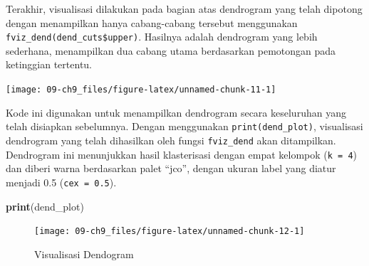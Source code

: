 \documentclass[
  oneside]{book}
\newenvironment{Shaded}{\begin{snugshade}}{\end{snugshade}}
\newcommand{\AttributeTok}[1]{\textcolor[rgb]{0.13,0.29,0.53}{#1}}
\newcommand{\DecValTok}[1]{\textcolor[rgb]{0.00,0.00,0.81}{#1}}
\newcommand{\FloatTok}[1]{\textcolor[rgb]{0.00,0.00,0.81}{#1}}
\newcommand{\FunctionTok}[1]{\textcolor[rgb]{0.13,0.29,0.53}{\textbf{#1}}}
\newcommand{\NormalTok}[1]{#1}
\newcommand{\OtherTok}[1]{\textcolor[rgb]{0.56,0.35,0.01}{#1}}
\newcommand{\SpecialCharTok}[1]{\textcolor[rgb]{0.81,0.36,0.00}{\textbf{#1}}}
\newcommand{\StringTok}[1]{\textcolor[rgb]{0.31,0.60,0.02}{#1}}
\begin{document}
Terakhir, visualisasi dilakukan pada bagian atas dendrogram yang telah dipotong dengan menampilkan hanya cabang-cabang tersebut menggunakan \texttt{fviz\_dend(dend\_cuts\$upper)}. Hasilnya adalah dendrogram yang lebih sederhana, menampilkan dua cabang utama berdasarkan pemotongan pada ketinggian tertentu.

\begin{Shaded}
\end{Shaded}

\begin{center}\texttt{[image: 09-ch9\_files/figure-latex/unnamed-chunk-11-1]} \end{center}

Kode ini digunakan untuk menampilkan dendrogram secara keseluruhan yang telah disiapkan sebelumnya. Dengan menggunakan \texttt{print(dend\_plot)}, visualisasi dendrogram yang telah dihasilkan oleh fungsi \texttt{fviz\_dend} akan ditampilkan. Dendrogram ini menunjukkan hasil klasterisasi dengan empat kelompok (\texttt{k\ =\ 4}) dan diberi warna berdasarkan palet ``jco'', dengan ukuran label yang diatur menjadi 0.5 (\texttt{cex\ =\ 0.5}).

\begin{Shaded}
\begin{Highlighting}[]
\FunctionTok{print}\NormalTok{(dend\_plot)}
\end{Highlighting}
\end{Shaded}

\begin{figure}[h]

{\centering \texttt{[image: 09-ch9\_files/figure-latex/unnamed-chunk-12-1]} 

}

\caption{Visualisasi Dendogram}\label{fig:unnamed-chunk-12}
\end{figure}
\end{document}
